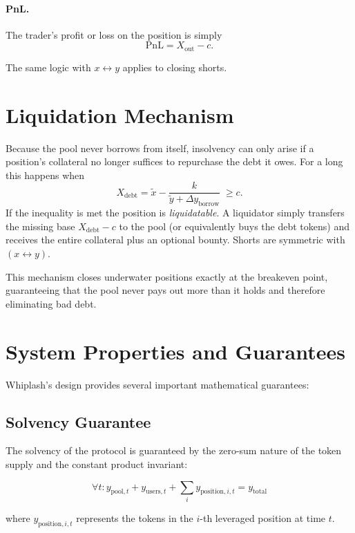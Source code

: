 \documentclass[11pt]{article}
\begin{document}
\paragraph{PnL.}  The trader's profit or loss on the position is simply
\[
\text{PnL} = X_{\text{out}} - c .
\]

The same logic with $x\leftrightarrow y$ applies to closing shorts.

\section{Liquidation Mechanism}

Because the pool never borrows from itself, insolvency can only arise if a position's collateral no longer suffices to repurchase the debt it owes.  For a long this happens when
\[
X_{\text{debt}} = \tilde x - \frac{k}{\tilde y + \Delta y_{\text{borrow}}} \;\ge c .
\]
If the inequality is met the position is \emph{liquidatable}.  A liquidator simply transfers the missing base $X_{\text{debt}}-c$ to the pool (or equivalently buys the debt tokens) and receives the entire collateral plus an optional bounty.  Shorts are symmetric with $(x\leftrightarrow y)$.

This mechanism closes underwater positions exactly at the breakeven point, guaranteeing that the pool never pays out more than it holds and therefore eliminating bad debt.

\section{System Properties and Guarantees}

Whiplash's design provides several important mathematical guarantees:

\subsection{Solvency Guarantee}

The solvency of the protocol is guaranteed by the zero-sum nature of the token supply and the constant product invariant:

\begin{equation}
\forall t: y_{\text{pool},t} + y_{\text{users},t} + \sum_{i} y_{\text{position},i,t} = y_{\text{total}}
\end{equation}

where $y_{\text{position},i,t}$ represents the tokens in the $i$-th leveraged position at time $t$.
\end{document}
